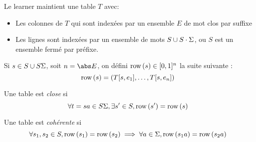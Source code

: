 Le learner maintient une table $T$ avec:

\begin{itemize}
	\item Les colonnes de $T$ qui sont indexées par un ensemble $E$ de mot clos par suffixe
	\item Les lignes sont indexées par un ensemble de mots $S \cup S\cdot \Sigma$, ou $S$ est
	      un ensemble fermé par préfixe.
\end{itemize}


\begin{definition}
	Si $s \in S \cup S\Sigma$, soit $n = \abs E$,  on défini $\text{row}\left(s\right) \in [0,1]^n$ la suite suivante :
	$$ \text{row}\left(s\right) = (T[s,e_1], \ldots, T[s, e_n])$$
\end{definition}

\begin{definition}
	Une table est \emph{close} si
	$$ \forall t = sa \in S\Sigma, \exists s'\in S, \text{row}\left(s'\right) = \text{row}\left(s\right)$$
\end{definition}

\begin{definition}
	Une table est \emph{cohérente} si
	$$ \forall s_1, s_2 \in S, \text{row}\left(s_1\right) = \text{row}\left(s_2\right) \implies \forall a \in \Sigma, \text{row}\left(s_1a\right) = \text{row}\left(s_2a\right)$$
\end{definition}



